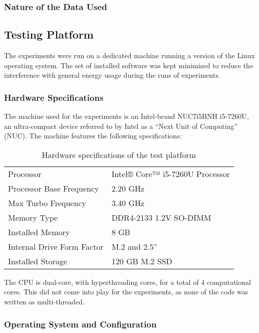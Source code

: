 \subsubsection{Nature of the Data Used}

\subsection{Testing Platform}

The experiments were run on a dedicated machine running a version of the Linux operating system. The set of installed software was kept minimized to reduce the interference with general energy usage during the runs of experiments.

\subsubsection{Hardware Specifications}

The machine used for the experiments is an Intel-brand NUC7i5BNH i5-7260U, an ultra-compact device referred to by Intel as a ``Next Unit of Computing'' (NUC). The machine features the following specifications:

\begin{table}[h!]
\begin{center}
\begin{tabular}{|ll|}
\hline
Processor & Intel® Core™ i5-7260U Processor\\
Processor Base Frequency & 2.20 GHz\\
Max Turbo Frequency & 3.40 GHz\\
Memory Type & DDR4-2133 1.2V SO-DIMM\\
Installed Memory & 8 GB\\
Internal Drive Form Factor & M.2 and 2.5''\\
Installed Storage & 120 GB M.2 SSD\\
\hline
\end{tabular}
\caption{Hardware specifications of the test platform}
\end{center}
\label{table:hardware_specs}
\end{table}

The CPU is dual-core, with hyperthreading cores, for a total of 4 computational cores. This did not come into play for the experiments, as none of the code was written as multi-threaded.

\subsubsection{Operating System and Configuration}

